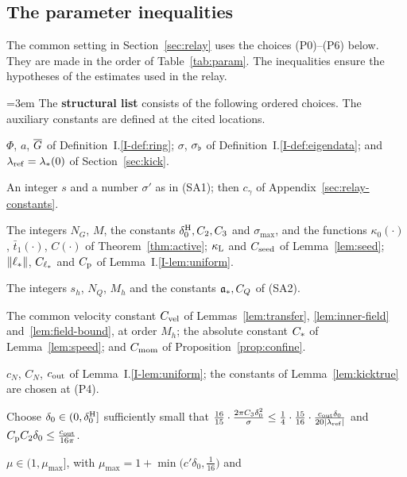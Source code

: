 \subsection{The parameter inequalities}
\label{sec:param-lists}

The common setting in Section~\ref{sec:relay} uses the choices (P0)--(P6)
below. They are made in the order of Table~\ref{tab:param}. The inequalities
ensure the hypotheses of the estimates used in the relay.

\begin{definition}
\label{def:P0-P4}
\emergencystretch=3em
The \textbf{structural list} consists of the following ordered choices.
The auxiliary constants are defined at the cited locations.
\begin{description}[font=\normalfont]
\item[\textup{(P0.1)}] $\Phi$, $a$, $\overline{G}$ of Definition~I.\ref{I-def:ring};
  $\sigma$, $\sigma_\flat$ of Definition~I.\ref{I-def:eigendata}; and
  $\lambda_{\mathrm{ref}}=\lambda_*(0)$ of Section~\ref{sec:kick}.
\item[\textup{(P0.2)}] An integer $s$ and a number $\sigma'$ as in (SA1); then
  $c_\gamma$ of Appendix~\ref{sec:relay-constants}.
\item[\textup{(P0.3)}] The integers $N_G$, $M$, the constants
  $\delta_0^{\mathrm{H}},C_2,C_3$ and $\sigma_{\max}$, and the functions
  $\kappa_0(\cdot)$, $\bar t_1(\cdot)$, $C(\cdot)$ of Theorem~\ref{thm:active};
  $\kappa_{\mathrm{L}}$ and $C_{\mathrm{seed}}$ of Lemma~\ref{lem:seed}; $\|\ell_*\|$, $C_{\ell_*}$ and $C_{\mathrm{p}}$ of
  Lemma~I.\ref{I-lem:uniform}.
\item[\textup{(P0.4)}] The integers $s_h$, $N_Q$, $M_h$ and the constants
  $\mathfrak{a}_*,C_Q$ of (SA2).
\item[\textup{(P0.5)}] The common velocity constant $C_{\mathrm{vel}}$ of
  Lemmas~\ref{lem:transfer}, \ref{lem:inner-field} and~\ref{lem:field-bound},
  at order $M_h$; the absolute constant $C_{*}$ of Lemma~\ref{lem:speed}; and
  $C_{\mathrm{mom}}$ of Proposition~\ref{prop:confine}.
\item[\textup{(P0.6)}] $c_N$, $C_N$, $c_{\mathrm{out}}$ of Lemma~I.\ref{I-lem:uniform};
  the constants of Lemma~\ref{lem:kicktrue} are chosen at (P4).
\item[\textup{(P1)}] Choose $\delta_0\in(0,\delta_0^{\mathrm{H}}]$ sufficiently small that
  $\frac{16}{15}\cdot\frac{2\pi C_3\delta_0^2}{\sigma}\le\frac14\cdot\frac{15}{16}\cdot\frac{c_{\mathrm{out}}\delta_0}{20|\lambda_{\mathrm{ref}}|}$
  and $C_{\mathrm{p}} C_2\delta_0\le\frac{c_{\mathrm{out}}}{16\pi}$.
\item[\textup{(P2)}] $\mu\in(1,\mu_{\max}]$, with
  $\mu_{\max}=1+\min\big(c'\delta_0,\frac1{16}\big)$ and

\end{description}
\end{definition}
